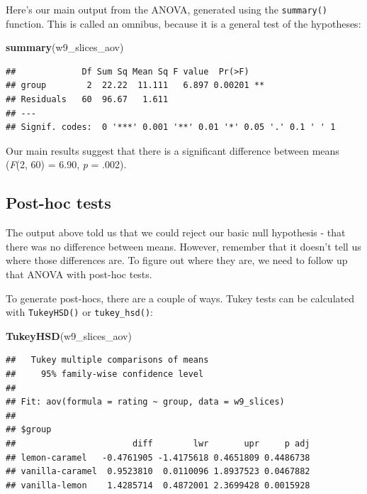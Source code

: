 \documentclass[
]{book}
\newenvironment{Shaded}{\begin{snugshade}}{\end{snugshade}}
\newcommand{\FunctionTok}[1]{\textcolor[rgb]{0.13,0.29,0.53}{\textbf{#1}}}
\newcommand{\NormalTok}[1]{#1}
\begin{document}
Here's our main output from the ANOVA, generated using the \texttt{summary()} function. This is called an omnibus, because it is a general test of the hypotheses:

\begin{Shaded}
\begin{Highlighting}[]
\FunctionTok{summary}\NormalTok{(w9\_slices\_aov)}
\end{Highlighting}
\end{Shaded}

\begin{verbatim}
##             Df Sum Sq Mean Sq F value  Pr(>F)   
## group        2  22.22  11.111   6.897 0.00201 **
## Residuals   60  96.67   1.611                   
## ---
## Signif. codes:  0 '***' 0.001 '**' 0.01 '*' 0.05 '.' 0.1 ' ' 1
\end{verbatim}

Our main results suggest that there is a significant difference between means (\emph{F}(2, 60) = 6.90, \emph{p} = .002).

\subsection{Post-hoc tests}\label{post-hoc-tests-1}

The output above told us that we could reject our basic null hypothesis - that there was no difference between means. However, remember that it doesn't tell us where those differences are. To figure out where they are, we need to follow up that ANOVA with post-hoc tests.

To generate post-hocs, there are a couple of ways. Tukey tests can be calculated with \texttt{TukeyHSD()} or \texttt{tukey\_hsd()}:

\begin{Shaded}
\begin{Highlighting}[]
\FunctionTok{TukeyHSD}\NormalTok{(w9\_slices\_aov)}
\end{Highlighting}
\end{Shaded}

\begin{verbatim}
##   Tukey multiple comparisons of means
##     95% family-wise confidence level
## 
## Fit: aov(formula = rating ~ group, data = w9_slices)
## 
## $group
##                       diff        lwr       upr     p adj
## lemon-caramel   -0.4761905 -1.4175618 0.4651809 0.4486738
## vanilla-caramel  0.9523810  0.0110096 1.8937523 0.0467882
## vanilla-lemon    1.4285714  0.4872001 2.3699428 0.0015928
\end{verbatim}
\end{document}
